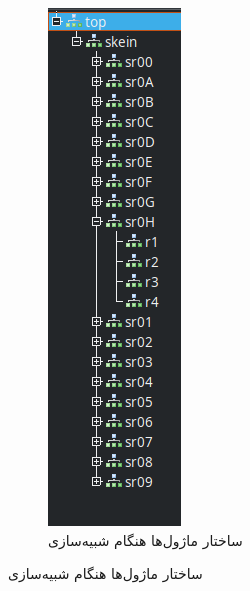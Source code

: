 \begin{figure}[H]
\centering
\begin{subfigure}{.5\textwidth}
  \centering
  \includegraphics[width=0.5\linewidth]{figs/DescriptionOfSystem/hierarchial_design.png}
  \caption{ساختار ماژول‌ها هنگام شبیه‌سازی}
  \label{module_diagram}

\end{subfigure}
\end{figure}
